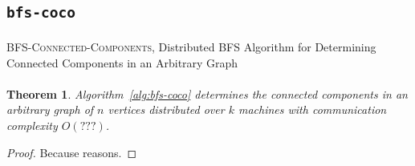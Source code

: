 \documentclass[11pt,epsf]{article}
\newtheorem{theorem}{Theorem}
\newcommand{\TODO}[0]{\textbf{\color{red}{TODO}}}
\begin{document}
{  \subsection{\texttt{bfs-coco}}{
    \paragraph{}{
      \begin{algorithm}
        \footnotesize
        \caption{\textsc{BFS-Connected-Components}, Distributed BFS Algorithm for Determining Connected Components in an Arbitrary Graph}
        \label{alg:bfs-coco}
        \begin{algorithmic}
          \STATE{\TODO}
        \end{algorithmic}
      \end{algorithm}
    }
    \paragraph{}{
      \TODO
    }

    \begin{theorem}
      \label{thm:bfs-coco}
      Algorithm~\ref{alg:bfs-coco} determines the connected components in an arbitrary graph
      of $n$ vertices distributed over $k$ machines with communication complexity $O(???)$.
    \end{theorem}
    \begin{proof}
      Because reasons.
    \end{proof}
  }
}
\end{document}
